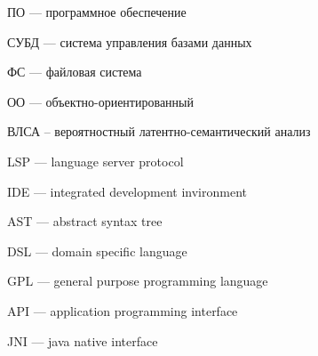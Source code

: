 
\hypertarget{ПО}{ПО --- программное обеспечение}

\hypertarget{СУБД}{СУБД --- система управления базами данных}

\hypertarget{ФС}{ФС --- файловая система}

\hypertarget{ОО}{ОО --- объектно-ориентированный}

\hypertarget{ВЛСА}{ВЛСА -- вероятностный латентно-семантический анализ}

\hypertarget{LSP}{LSP --- language server protocol}

\hypertarget{IDE}{IDE --- integrated development invironment}

\hypertarget{AST}{AST --- abstract syntax tree}

\hypertarget{DSL}{DSL --- domain specific language}

\hypertarget{GPL}{GPL --- general purpose programming language}

\hypertarget{API}{API --- application programming interface}

\hypertarget{JNI}{JNI --- java native interface}

\clearpage